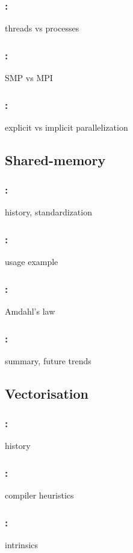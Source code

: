 \documentclass[9pt,xcolor=table]{beamer}
\begin{document}
\begin{frame}
\frametitle{\insertsectionhead{}: \insertsubsectionhead{}}
threads vs processes
\end{frame}

\begin{frame}
\frametitle{\insertsectionhead{}: \insertsubsectionhead{}}
SMP vs MPI
\end{frame}

\begin{frame}
\frametitle{\insertsectionhead{}: \insertsubsectionhead{}}
explicit vs implicit parallelization
\end{frame}

\subsection{Shared-memory}
\begin{frame}
\frametitle{\insertsectionhead{}: \insertsubsectionhead{}}
history, standardization
\end{frame}

\begin{frame}
\frametitle{\insertsectionhead{}: \insertsubsectionhead{}}
usage example
\end{frame}

\begin{frame}
\frametitle{\insertsectionhead{}: \insertsubsectionhead{}}
Amdahl's law
\end{frame}

\begin{frame}
\frametitle{\insertsectionhead{}: \insertsubsectionhead{}}
summary, future trends
\end{frame}

\subsection{Vectorisation}
\begin{frame}
\frametitle{\insertsectionhead{}: \insertsubsectionhead{}}
history
\end{frame}

\begin{frame}
\frametitle{\insertsectionhead{}: \insertsubsectionhead{}}
compiler heuristics
\end{frame}

\begin{frame}
\frametitle{\insertsectionhead{}: \insertsubsectionhead{}}
intrinsics
\end{frame}
\end{document}
